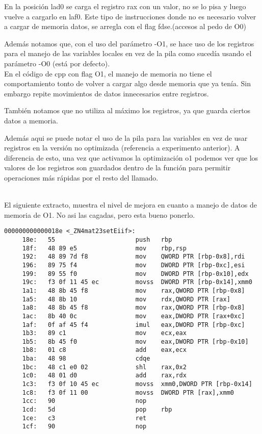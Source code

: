 En la posición lad0 se carga el registro rax con un valor, no se lo pisa y luego vuelve a cargarlo en laf0. Este tipo de instrucciones donde no es necesario volver a cargar de memoria datos, se arregla con el flag fdse.(accesos al pedo de O0)

Además notamos que, con el uso del parámetro -O1, se hace uso de los registros para el manejo de las variables locales en vez de la pila como sucedía usando el parámetro -O0 (está por defecto).\\

En el código de cpp con flag O1, el manejo de memoria no tiene el comportamiento tonto de volver a cargar algo desde memoria que ya tenía. Sin embargo repite movimientos de datos innecesarios entre registros.

También notamos que no utiliza al máximo los registros, ya que guarda ciertos datos a memoria.


Además aqui se puede notar el uso de la pila para las variables en vez de usar registros en la versión no optimizada (referencia a experimento anterior). A diferencia de esto, una vez que activamos la optimización o1 podemos ver que los valores de los registros son guardados dentro de la función para permitir operaciones más rápidas por el resto del llamado.


~\\


El siguiente extracto, muestra el nivel de mejora en cuanto a manejo de datos de memoria de O1. No asi las cagadas, pero esta bueno ponerlo.

\begin{verbatim}
000000000000018e <_ZN4mat23setEiif>:
     18e:	55                   	push   rbp
     18f:	48 89 e5             	mov    rbp,rsp
     192:	48 89 7d f8          	mov    QWORD PTR [rbp-0x8],rdi
     196:	89 75 f4             	mov    DWORD PTR [rbp-0xc],esi
     199:	89 55 f0             	mov    DWORD PTR [rbp-0x10],edx
     19c:	f3 0f 11 45 ec       	movss  DWORD PTR [rbp-0x14],xmm0
     1a1:	48 8b 45 f8          	mov    rax,QWORD PTR [rbp-0x8]
     1a5:	48 8b 10             	mov    rdx,QWORD PTR [rax]
     1a8:	48 8b 45 f8          	mov    rax,QWORD PTR [rbp-0x8]
     1ac:	8b 40 0c             	mov    eax,DWORD PTR [rax+0xc]
     1af:	0f af 45 f4          	imul   eax,DWORD PTR [rbp-0xc]
     1b3:	89 c1                	mov    ecx,eax
     1b5:	8b 45 f0             	mov    eax,DWORD PTR [rbp-0x10]
     1b8:	01 c8                	add    eax,ecx
     1ba:	48 98                	cdqe   
     1bc:	48 c1 e0 02          	shl    rax,0x2
     1c0:	48 01 d0             	add    rax,rdx
     1c3:	f3 0f 10 45 ec       	movss  xmm0,DWORD PTR [rbp-0x14]
     1c8:	f3 0f 11 00          	movss  DWORD PTR [rax],xmm0
     1cc:	90                   	nop
     1cd:	5d                   	pop    rbp
     1ce:	c3                   	ret    
     1cf:	90                   	nop
\end{verbatim}

